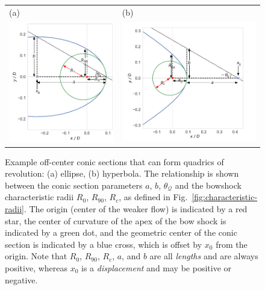 \newcommand{\Q}{\ensuremath{\mathcal{Q}}}
\newcommand{\thetaQ}{\ensuremath{\theta_{\scriptscriptstyle \Q}}}


\begin{figure}
  \setlength\tabcolsep{2em}
  \begin{tabular}{ll}
    (a) & (b) \\
    \includegraphics[height=0.45\linewidth]{figs/ellipse_edited}
        & \includegraphics[height=0.45\linewidth]{figs/hyperbola_edited}
  \end{tabular}
  \caption[]{Example off-center conic sections that can form quadrics of
    revolution: (a) ellipse, (b) hyperbola.  The relationship is shown
    between the conic section parameters \(a\), \(b\), \(\thetaQ\) and the
    bowshock characteristic radii \(R_0\), \(R_{90}\), \(R_c\), as
    defined in Fig.~\ref{fig:characteristic-radii}. The origin (center
    of the weaker flow) is indicated by a red star, the center of
    curvature of the apex of the bow shock is indicated by a green
    dot, and the geometric center of the conic section is indicated by
    a blue cross, which is offset by \(x_0\) from the origin.  Note
    that \(R_0\), \(R_{90}\), \(R_c\), \(a\), and \(b\) are all
    \emph{lengths} and are always positive, whereas \(x_0\) is a
    \emph{displacement} and may be positive or negative.}
  \label{fig:conics}
\end{figure}
